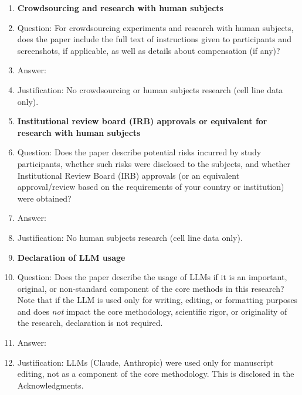 \documentclass{article}
\begin{document}
\begin{enumerate}
\item {\bf Crowdsourcing and research with human subjects}
    \item[] Question: For crowdsourcing experiments and research with human subjects, does the paper include the full text of instructions given to participants and screenshots, if applicable, as well as details about compensation (if any)?
    \item[] Answer: \answerNA{}
    \item[] Justification: No crowdsourcing or human subjects research (cell line data only).

\item {\bf Institutional review board (IRB) approvals or equivalent for research with human subjects}
    \item[] Question: Does the paper describe potential risks incurred by study participants, whether such risks were disclosed to the subjects, and whether Institutional Review Board (IRB) approvals (or an equivalent approval/review based on the requirements of your country or institution) were obtained?
    \item[] Answer: \answerNA{}
    \item[] Justification: No human subjects research (cell line data only).

\item {\bf Declaration of LLM usage}
    \item[] Question: Does the paper describe the usage of LLMs if it is an important, original, or non-standard component of the core methods in this research? Note that if the LLM is used only for writing, editing, or formatting purposes and does \emph{not} impact the core methodology, scientific rigor, or originality of the research, declaration is not required.
    \item[] Answer: \answerNA{}
    \item[] Justification: LLMs (Claude, Anthropic) were used only for manuscript editing, not as a component of the core methodology. This is disclosed in the Acknowledgments.

\end{enumerate}
\end{document}
